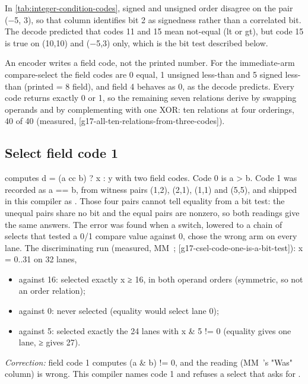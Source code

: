 In \cref{tab:integer-condition-codes}, signed and unsigned order disagree on the pair (−5, 3), so that column identifies bit 2 as signedness rather than a
correlated bit. The decode predicted that codes 11 and 15 mean not-equal (lt or gt), but code 15 is true on
(10,10) and (−5,3) only, which is the bit test described below.

An encoder writes a field code, not the printed number. For the immediate-arm compare-select the field
codes are 0 equal, 1 unsigned less-than and 5 signed less-than (printed = 8 \textbar{} field), and field 4 behaves as 0, as the
decode predicts. Every code returns exactly 0 or 1, so the remaining seven relations derive by swapping operands and by
complementing with one XOR: ten relations at four orderings, 40 of 40 (measured, 
{[}g17-all-ten-relations-from-three-codes{]}).

\subsection*{Select field code 1}\label{sub:field-code-1}

 computes d = (a cc b) ? x : y with two field codes. Code 0 is a > b. Code
1 was recorded as a == b, from witness pairs (1,2), (2,1), (1,1) and (5,5), and shipped in this compiler as
. Those four pairs cannot tell equality from a bit test: the unequal pairs share no bit and the equal pairs
are nonzero, so both readings give the same answers. The error was found when a switch, lowered to a chain of selects that
tested a 0/1 compare value against 0, chose the wrong arm on every lane. The discriminating run (measured, MM~;
 {[}g17-csel-code-one-is-a-bit-test{]}): x = 0..31 on 32 lanes,

\begin{itemize}
\item against 16: selected exactly x ≥ 16, in both operand orders (symmetric, so not an order relation);
\item against 0: never selected (equality would select lane 0);
\item against 5: selected exactly the 24 lanes with x \& 5 != 0 (equality gives one lane, ≥ gives 27).
\end{itemize}

\emph{Correction:} field code 1 computes (a \& b) != 0, and the  reading (MM~'s "Was" column) is
wrong. This compiler names code 1  and refuses a select that asks for .

